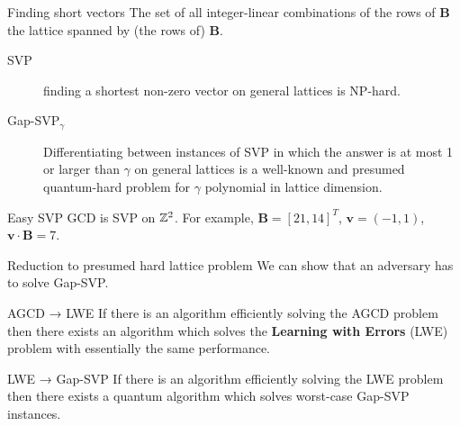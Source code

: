 \documentclass[presentation,smaller]{beamer}
\renewcommand{\vec}[1]{\ensuremath{\mathbf{#1}}\xspace}
\begin{document}
\begin{frame}[label={sec:orgbaebb79}]{Finding short vectors}
The set of all integer-linear combinations of the rows of \(\vec{B}\) the \alert{lattice} spanned by (the rows of) \(\vec{B}\).

\begin{description}
\item[{SVP}] finding a \alert{shortest} non-zero vector on \alert{general} lattices is NP-hard.

\item[{Gap-SVP\(_\gamma\)}] Differentiating between instances of SVP in which the answer is at most 1 or larger than \(\gamma\) on \alert{general} lattices is a well-known and presumed quantum-hard problem for \(\gamma\) polynomial in lattice dimension.
\end{description}

\begin{block}{Easy SVP}
GCD is SVP on \(\mathbb{Z}^2\). For example, \(\vec{B} = {[21, 14]}^T\), \(\vec{v} = (-1,1)\), \(\vec{v} ⋅\vec{B} = 7\).
\end{block}
\end{frame}

\begin{frame}[label={sec:orgdb291c2}]{Reduction to presumed hard lattice problem}
We can show that an adversary \alert{has} to solve Gap-SVP.

\begin{block}{AGCD → LWE}
If there is an algorithm efficiently solving the AGCD problem then there exists an algorithm which solves the \textbf{Learning with Errors} (LWE) problem with essentially the same performance.  
\end{block}

\begin{block}{LWE → Gap-SVP}
If there is an algorithm efficiently solving the LWE problem then there exists a quantum algorithm which solves worst-case Gap-SVP instances.
\end{block}
\end{frame}
\end{document}
